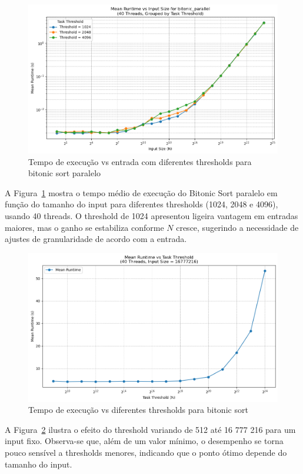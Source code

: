 \documentclass{article}
\begin{document}
\begin{figure}[H]
    \centering
    \includegraphics[width=0.8\linewidth]{images/threshold_comp1.png}
    \caption{Tempo de execução vs entrada com diferentes thresholds para bitonic sort paralelo}
    \label{fig:thresholdByInput}
\end{figure}

A Figura~\ref{fig:thresholdByInput} mostra o tempo médio de execução do Bitonic Sort paralelo em função do tamanho do input para diferentes thresholds (1024, 2048 e 4096), usando 40 threads. O threshold de 1024 apresentou ligeira vantagem em entradas maiores, mas o ganho se estabiliza conforme $N$ cresce, sugerindo a necessidade de ajustes de granularidade de acordo com a entrada.

\begin{figure}[H]
    \centering
    \includegraphics[width=0.8\linewidth]{images/threshold.png}
    \caption{Tempo de execução vs diferentes thresholds para bitonic sort}
    \label{fig:enter-label}
\end{figure}

A Figura~\ref{fig:enter-label} ilustra o efeito do threshold variando de 512 até 16 777 216 para um input fixo. Observa-se que, além de um valor mínimo, o desempenho se torna pouco sensível a thresholds menores, indicando que o ponto ótimo depende do tamanho do input.
\end{document}
